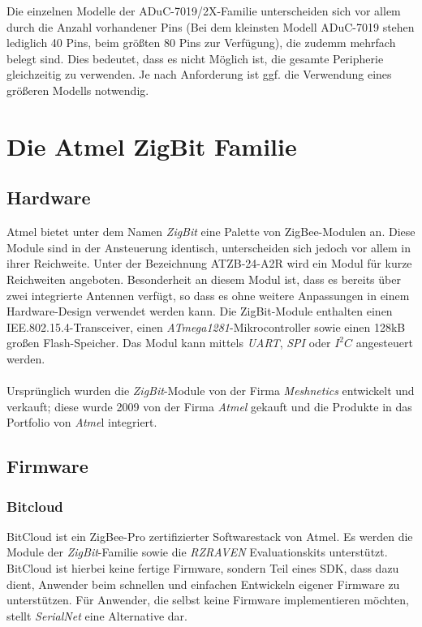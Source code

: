         Die einzelnen Modelle der ADuC-7019/2X-Familie unterscheiden sich vor allem durch die Anzahl vorhandener Pins (Bei dem
        kleinsten Modell ADuC-7019 stehen lediglich 40 Pins, beim größten 80 Pins zur Verfügung), die zudemm mehrfach belegt
        sind. Dies bedeutet, dass es nicht Möglich ist, die gesamte Peripherie gleichzeitig zu verwenden. Je nach Anforderung
        ist ggf. die Verwendung eines größeren Modells notwendig. 

\section{Die Atmel ZigBit Familie}
    \subsection{Hardware}

        Atmel bietet unter dem Namen \emph{ZigBit} eine Palette von ZigBee-Modulen an. Diese Module sind in der
        Ansteuerung identisch, unterscheiden sich jedoch vor allem in ihrer Reichweite. Unter der Bezeichnung ATZB-24-A2R
        wird ein Modul für kurze Reichweiten angeboten. Besonderheit an diesem Modul ist, dass es bereits über zwei 
        integrierte Antennen verfügt, so dass es ohne weitere Anpassungen in einem Hardware-Design verwendet werden kann.
        Die ZigBit-Module enthalten einen IEE.802.15.4-Transceiver, einen \emph{ATmega1281}-Mikrocontroller sowie einen
        128kB großen Flash-Speicher. Das Modul kann mittels \emph{UART}, \emph{SPI} oder \emph{$I^2C$} angesteuert werden.\\
        \\
        Ursprünglich wurden die \emph{ZigBit}-Module von der Firma \emph{Meshnetics} entwickelt und verkauft; diese wurde 
        2009 von der Firma \emph{Atmel} gekauft und die Produkte in das Portfolio von \emph{Atme}l integriert.

    \subsection{Firmware}
        \subsubsection{Bitcloud}
            BitCloud ist ein ZigBee-Pro zertifizierter Softwarestack von Atmel. Es werden die Module der \emph{ZigBit}-Familie
            sowie die \emph{RZRAVEN} Evaluationskits unterstützt. BitCloud ist hierbei keine fertige Firmware, sondern 
            Teil eines SDK, dass dazu dient, Anwender beim schnellen und einfachen Entwickeln eigener Firmware zu
            unterstützen. Für Anwender, die selbst keine Firmware implementieren möchten, stellt \emph{SerialNet} eine
            Alternative dar.

